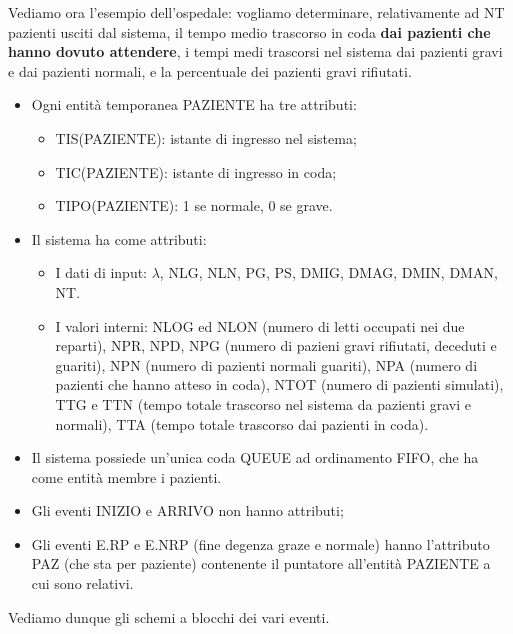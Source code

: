 \documentclass[11pt]{book}
\begin{document}
Vediamo ora l'esempio dell'ospedale: vogliamo determinare,
relativamente ad NT pazienti usciti dal sistema, il tempo medio
trascorso in coda {\bf dai pazienti che hanno dovuto attendere}, i
tempi medi trascorsi nel sistema dai pazienti gravi e dai pazienti
normali, e la percentuale dei pazienti gravi rifiutati. 

\begin{itemize}
\item Ogni entit\`a temporanea PAZIENTE ha tre attributi:
  \begin{itemize}
  \item TIS(PAZIENTE): istante di ingresso nel sistema;
  \item TIC(PAZIENTE): istante di ingresso in coda;
  \item TIPO(PAZIENTE): 1 se normale, 0 se grave.
  \end{itemize}
\item Il sistema ha come attributi:
  \begin{itemize}
  \item I dati di input: $\lambda$, NLG, NLN, PG, PS, DMIG, DMAG,
    DMIN, DMAN, NT. 
  \item I valori interni: NLOG ed NLON (numero di letti occupati nei
    due reparti), NPR, NPD, NPG (numero di pazieni gravi rifiutati,
    deceduti e guariti), NPN (numero di pazienti normali guariti), NPA
    (numero di pazienti che hanno atteso in coda), NTOT (numero di
    pazienti simulati), TTG e TTN (tempo totale trascorso nel sistema
    da pazienti gravi e normali), TTA (tempo totale trascorso dai
    pazienti in coda).
  \end{itemize}
\item Il sistema possiede un'unica coda QUEUE ad ordinamento FIFO, che
  ha come entit\`a membre i pazienti.
\item Gli eventi INIZIO e ARRIVO non hanno attributi;
\item Gli eventi E.RP e E.NRP (fine degenza graze e normale) hanno
  l'attributo PAZ (che sta per paziente) contenente il puntatore
  all'entit\`a PAZIENTE a cui sono relativi.
\end{itemize}

Vediamo dunque gli schemi a blocchi dei vari eventi.
\end{document}

